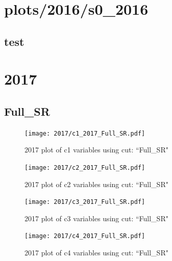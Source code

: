 \documentclass{article}
\begin{document}
    \section*{plots/2016/s0_2016}
      \subsection*{test}
    \section*{2017}
      \subsection*{Full\_SR}
                        \begin{figure}[H]
                            \centering
                            \caption{2017 plot of c1 variables using cut: ``Full\_SR"}
                            \texttt{[image: 2017/c1\_2017\_Full\_SR.pdf]}
                        \end{figure}    
                        \begin{figure}[H]
                            \centering
                            \caption{2017 plot of c2 variables using cut: ``Full\_SR"}
                            \texttt{[image: 2017/c2\_2017\_Full\_SR.pdf]}
                        \end{figure}    
                        \begin{figure}[H]
                            \centering
                            \caption{2017 plot of c3 variables using cut: ``Full\_SR"}
                            \texttt{[image: 2017/c3\_2017\_Full\_SR.pdf]}
                        \end{figure}    
                        \begin{figure}[H]
                            \centering
                            \caption{2017 plot of c4 variables using cut: ``Full\_SR"}
                            \texttt{[image: 2017/c4\_2017\_Full\_SR.pdf]}
                        \end{figure}    
\end{document}
